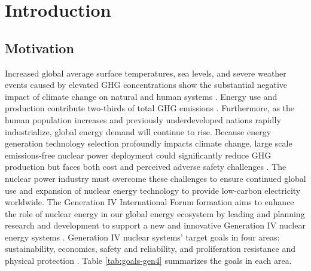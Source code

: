 \chapter{Introduction}
\label{chap:intro}


\section{Motivation}
Increased global average surface temperatures, sea levels, and severe weather 
events caused by elevated \gls{GHG} concentrations show the substantial 
negative impact of climate change on natural and human systems
\cite{noauthor_climate_2018}.
Energy use and production contribute two-thirds of total \gls{GHG}
emissions \cite{noauthor_climate_2018}.
Furthermore, as the human population increases and previously underdeveloped 
nations rapidly industrialize, global energy demand will continue to rise.  
Because energy generation technology selection profoundly impacts climate change, 
large scale emissions-free nuclear power deployment could 
significantly reduce GHG production but faces both cost and perceived adverse 
safety challenges \cite{noauthor_climate_2018, petti_future_2018}. 
The nuclear power industry must overcome these challenges to ensure continued 
global use and expansion of nuclear energy technology to provide low-carbon 
electricity worldwide.
The Generation IV International Forum formation aims to enhance the role of 
nuclear energy in our global energy ecosystem by leading and planning 
research and development to support a new and innovative Generation IV
nuclear energy systems \cite{gif_technology_2002}.
Generation IV nuclear systems' target goals in four areas: sustainability, 
economics, safety and reliability, and proliferation resistance and physical 
protection \cite{gif_technology_2002}. 
Table \ref{tab:goals-gen4} summarizes the goals in each area. 


